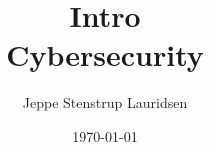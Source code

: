 \documentclass[12pt]{article}
\title{%
Intro \\
\large Cybersecurity}
\author{Jeppe Stenstrup Lauridsen}
\date{\today}
\begin{document}
\begin{titlepage}
\clearpage\maketitle
\thispagestyle{empty}
\end{titlepage}





\end{document}
